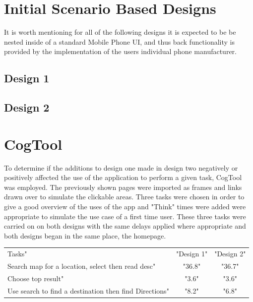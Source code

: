 \documentclass{article}
\begin{document}
\section{Initial Scenario Based Designs}
It is worth mentioning for all of the following designs it is expected to be be nested inside of a standard Mobile Phone UI, and thus back functionality is provided by the implementation of the users individual phone manufacturer.
\subsection{Design 1}



\subsection{Design 2}



\section{CogTool}
To determine if the additions to design one made in design two negatively or positively affected the use of the application to perform a given task, CogTool was employed.
The previously shown pages were imported as frames and links drawn over to simulate the clickable areas.
Three tasks were chosen in order to give a good overview of the uses of the app and "Think" times were added were appropriate to simulate the use case of a first time user.
These three tasks were carried on on both designs with the same delays applied where appropriate and both designs began in the same place, the homepage.
\begin{table}[H]
\hspace{-0.5cm}
\begin{tabular}{lcc}
\hline
Tasks"&"Design 1"&"Design 2" \\
Search map for a location, select then read desc"&"36.8"&"36.7" \\
Choose top result"&"3.6"&"3.6" \\
Use search to find a destination then find Directions"&"8.2"&"6.8" \\
\hline
\end{tabular}
\end{table}
\end{document}
